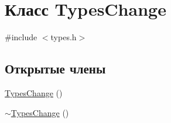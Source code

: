 \hypertarget{class_types_change}{}\section{Класс Types\+Change}
\label{class_types_change}


{\ttfamily \#include $<$types.\+h$>$}

\subsection*{Открытые члены}
\begin{DoxyCompactItemize}
\item 
\hyperlink{class_types_change_a2cec8ef75648e46702ea7babfe01d80f}{Types\+Change} ()
\item 
\hyperlink{class_types_change_af2231f556161643b79ea81a8cf76d141}{$\sim$\+Types\+Change} ()
\end{DoxyCompactItemize}
